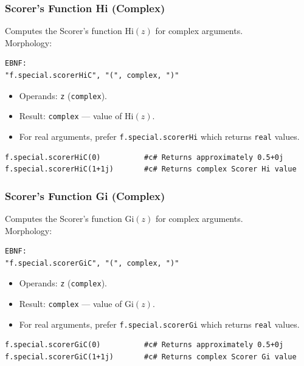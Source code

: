 \subsubsection{Scorer's Function Hi (Complex)}
Computes the Scorer's function $\text{Hi}(z)$ for complex arguments. \\
Morphology:
\begin{verbatim}
EBNF:
"f.special.scorerHiC", "(", complex, ")"
\end{verbatim}
\begin{itemize}
\item Operands: \texttt{z} (\texttt{complex}).
\item Result: \texttt{complex} --- value of $\text{Hi}(z)$.
\item For real arguments, prefer \texttt{f.special.scorerHi} which returns \texttt{real} values.
\end{itemize}
\begin{verbatim}
f.special.scorerHiC(0)          #c# Returns approximately 0.5+0j
f.special.scorerHiC(1+1j)       #c# Returns complex Scorer Hi value
\end{verbatim}

\subsubsection{Scorer's Function Gi (Complex)}
Computes the Scorer's function $\text{Gi}(z)$ for complex arguments. \\
Morphology:
\begin{verbatim}
EBNF:
"f.special.scorerGiC", "(", complex, ")"
\end{verbatim}
\begin{itemize}
\item Operands: \texttt{z} (\texttt{complex}).
\item Result: \texttt{complex} --- value of $\text{Gi}(z)$.
\item For real arguments, prefer \texttt{f.special.scorerGi} which returns \texttt{real} values.
\end{itemize}
\begin{verbatim}
f.special.scorerGiC(0)          #c# Returns approximately 0.5+0j
f.special.scorerGiC(1+1j)       #c# Returns complex Scorer Gi value
\end{verbatim}

